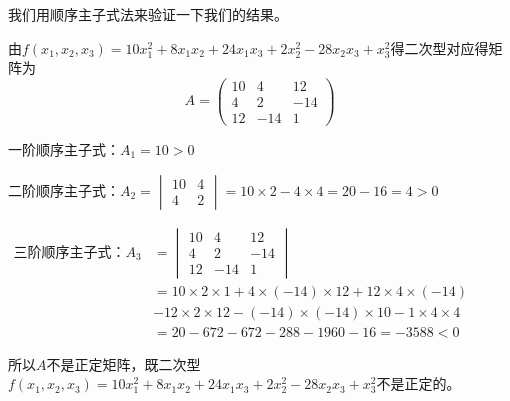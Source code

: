 \begin{solution}
  我们用顺序主子式法来验证一下我们的结果。

  由$f(x_1,x_2,x_3)=10x_1^2 + 8x_1x_2 + 24x_1x_3 + 2x_2^2 - 28x_2x_3 + x_3^2$得二次型对应得矩阵为\[A=
  \begin{pmatrix}
    10 & 4 & 12\\4 & 2 & -14\\12 & -14 & 1
  \end{pmatrix}\]

  一阶顺序主子式：$A_1=10>0$

  二阶顺序主子式：$A_2=\begin{vmatrix}10 & 4\\4 & 2\end{vmatrix}=10 \times 2-4 \times 4=20-16=4>0$

  $
    \begin{aligned}\text{三阶顺序主子式：}
      A_3 &=\begin{vmatrix}10 & 4 & 12\\4 & 2 & -14\\12 & -14 & 1\end{vmatrix} \\
  &=10 \times 2 \times 1+4 \times (-14) \times 12+12 \times 4 \times (-14)\\
  &-12 \times 2 \times 12-(-14) \times (-14) \times 10-1 \times 4 \times 4\\
  &=20-672-672-288-1960-16=-3588<0
    \end{aligned} $
    
    所以$A$不是正定矩阵，既二次型$f(x_1,x_2,x_3)=10x_1^2 + 8x_1x_2 + 24x_1x_3 + 2x_2^2 - 28x_2x_3 + x_3^2$不是正定的。
\end{solution}


